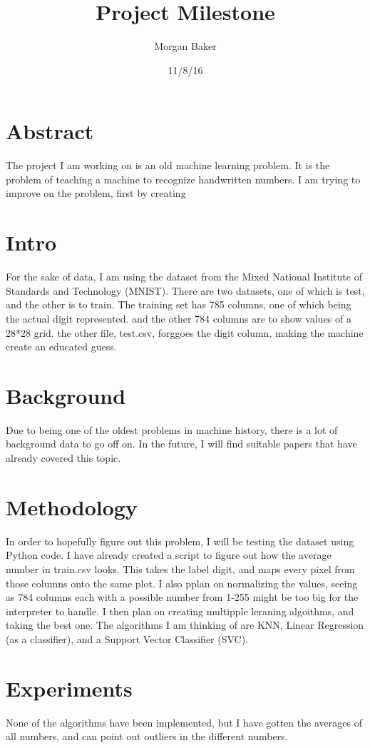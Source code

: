 \documentclass[a4paper]{article}
\title{Project Milestone}
\author{Morgan Baker}
\date{11/8/16}
\begin{document}
\lstset{language=Python}

\maketitle

\section{Abstract}
The project I am working on is an old machine learning problem. It is the problem of teaching a machine to recognize handwritten numbers. I am trying to improve on the problem, first by creating 
\section{Intro}
 For the sake of data, I am using the dataset from the Mixed National Institute of Standards and Technology (MNIST). There are two datasets, one of which is test, and the other is to train. The training set has 785 columns, one of which being the actual digit represented. and the other 784 columns are to show values of a 28*28 grid. the other file, test.csv, forggoes the digit column, making the machine create an educated guess.
\section{Background}
Due to being one of the oldest problems in machine history, there is a lot of background data to go off on. In the future, I will find suitable papers that have already covered this topic.
\section{Methodology}
In order to hopefully figure out this problem, I will be testing the dataset using Python code. I have already created a script to figure out how the average number in train.csv looks. This takes the label digit, and maps every pixel from those columns onto the same plot. I also pplan on normalizing the values, seeing as 784 columns each with a possible number from 1-255 might be too big for the interpreter to handle. I then plan on creating multipple leraning algoithms, and taking the best one. The algorithms I am thinking of are KNN, Linear Regression (as a classifier), and a Support Vector Classifier (SVC).
\section{Experiments}
None of the algorithms have been implemented, but I have gotten the averages of all numbers, and can point out outliers in the different numbers.
\end{document}
